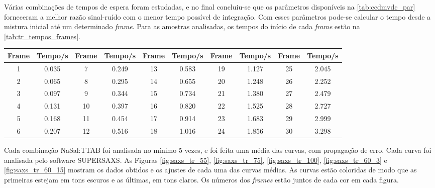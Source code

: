 	Várias combinações de tempos de espera foram estudadas, e no final concluiu-se que os parâmetros disponíveis na \autoref{tab:ccdmvdc_par} forneceram a melhor razão sinal-ruído com o menor tempo possível de integração. Com esses parâmetros pode-se calcular o tempo desde a mistura inicial até um determinado \emph{frame}. Para as amostras analisadas, os tempos do início de cada \emph{frame} estão na \autoref{tab:tr_tempos_frames}.
	
				\begin{table}[h]
		{%
			\begin{tabular}{c c | c c | c c | c c | c c}
				\toprule
				Frame & Tempo/s & Frame & Tempo/s & Frame & Tempo/s & Frame & Tempo/s & Frame & Tempo/s \\ \midrule
				  1   & 0.035   & 7     & 0.249   & 13    & 0.583   & 19    & 1.127   & 25    & 2.045   \\
				  2   & 0.065   & 8     & 0.295   & 14    & 0.655   & 20    & 1.248   & 26    & 2.252   \\
				  3   & 0.097   & 9     & 0.344   & 15    & 0.734   & 21    & 1.380   & 27    & 2.479   \\
				  4   & 0.131   & 10    & 0.397   & 16    & 0.820   & 22    & 1.525   & 28    & 2.727   \\
				  5   & 0.168   & 11    & 0.454   & 17    & 0.914   & 23    & 1.683   & 29    & 2.999   \\
				  6   & 0.207   & 12    & 0.516   & 18    & 1.016   & 24    & 1.856   & 30    & 3.298	\\ \bottomrule
			\end{tabular}
		}{}
	\end{table}  
	
	Cada combinação NaSal:TTAB foi analisada no mínimo 5 vezes, e foi feita uma média das curvas, com propagação de erro. Cada curva foi analisada pelo software SUPERSAXS. As Figuras \ref{fig:saxs_tr_55}, \ref{fig:saxs_tr_75}, \ref{fig:saxs_tr_100}, \ref{fig:saxs_tr_60_3} e \ref{fig:saxs_tr_60_15} mostram os dados obtidos e os ajustes de cada uma das curvas médias. As curvas estão coloridas de modo que as primeiras estejam em tons escuros e as últimas, em tons claros. Os números dos \emph{frames} estão juntos de cada cor em cada figura.
	
